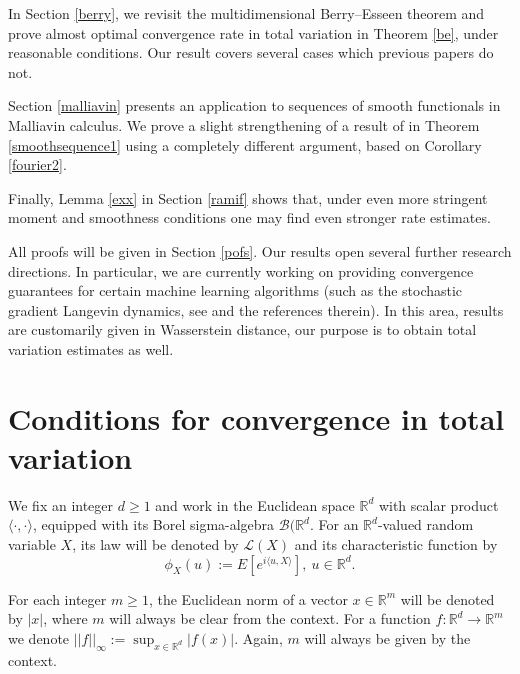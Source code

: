 \documentclass{article}
\begin{document}
In Section \ref{berry}, we revisit the multidimensional Berry--Esseen theorem and prove almost
optimal convergence rate in total variation in Theorem \ref{be}, under reasonable conditions.
Our result covers several cases which previous papers do not.

Section \ref{malliavin}
presents an application to sequences of smooth functionals in Malliavin calculus. 
We prove a slight strengthening of a result of \cite{bc2} in Theorem \ref{smoothsequence1} using a 
completely different argument, based on Corollary
\ref{fourier2}.

Finally, Lemma \ref{exx} in Section \ref{ramif} shows that, under even more stringent moment and
smoothness conditions one may find even stronger rate estimates. 

All proofs will be given in Section \ref{pofs}.
Our results open several further research directions. In particular, we are currently working on
providing convergence guarantees for certain machine learning algorithms (such as the stochastic gradient Langevin
dynamics, see \cite{6} and the references therein).
In this area, results are customarily given in Wasserstein distance, our purpose is to obtain
total variation estimates as well.


\section{Conditions for convergence in total variation}\label{tot}


We fix an integer $d\geq 1$ and work in the Euclidean space $\mathbb{R}^{d}$ with scalar product $\langle \cdot,\cdot\rangle$,{}
equipped with its Borel sigma-algebra $\mathcal{B}(\mathbb{R}^{d}$. For an $\mathbb{R}^{d}$-valued random variable $X$, its law will be denoted by $\mathcal{L}(X)$
and its characteristic function by
$$
\phi_{X}(u):=E[e^{i\langle u,X\rangle}],\ u\in\mathbb{R}^{d}.
$$

For each integer $m\geq 1$, the Euclidean norm of a vector $x\in\mathbb{R}^{m}$ will be denoted by $|x|$, where $m$ will always be clear from the context.
For a function $f:\mathbb{R}^{d}\to\mathbb{R}^{m}$ we denote $||f||_{\infty}:=\sup_{x\in\mathbb{R}^{d}}|f(x)|$. Again, $m$ will always be
given by the context.
\end{document}
